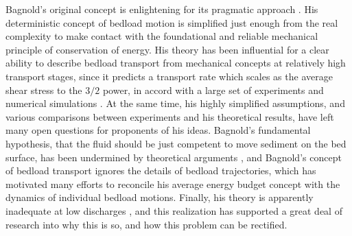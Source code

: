 \documentclass{article}
\begin{document}
Bagnold's original concept is enlightening for its pragmatic approach \citep{Ashida1972, Bagnold1973, Engelund1976, Luque1976}. 
His deterministic concept of bedload motion is simplified just enough from the real complexity to make contact with the foundational and reliable mechanical principle of conservation of energy. 
His theory has been influential for a clear ability to describe bedload transport from mechanical concepts at relatively high transport stages, since it predicts a transport rate which scales as the average shear stress to the $3/2$ power, in accord with a large set of experiments and numerical simulations \citep{MeyerPeter1948,Gomez1989,Schmeeckle2014, Elghannay2017}.
At the same time, his highly simplified assumptions, and various comparisons between experiments and his theoretical results, have left many open questions for proponents of his ideas. 
Bagnold's fundamental hypothesis, that the fluid should be just competent to move sediment on the bed surface, has been undermined by theoretical arguments \citep{Seminara2002}, and Bagnold's concept of bedload transport ignores the details of bedload trajectories, which has motivated many efforts to reconcile his average energy budget concept with the dynamics of individual bedload motions. 
Finally, his theory is apparently inadequate at low discharges \citep{Engelund1976, Luque1976, Francis1977, Ancey2008}, and this realization has supported a great deal of research into why this is so, and how this problem can be rectified. 
\end{document}
